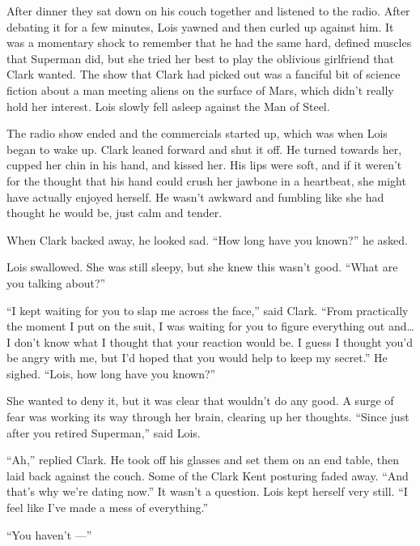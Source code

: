 After dinner they sat down on his couch together and listened to the
radio. After debating it for a few minutes, Lois yawned and then curled
up against him. It was a momentary shock to remember that he had the
same hard, defined muscles that Superman did, but she tried her best to
play the oblivious girlfriend that Clark wanted. The show that Clark had
picked out was a fanciful bit of science fiction about a man meeting
aliens on the surface of Mars, which didn't really hold her interest.
Lois slowly fell asleep against the Man of Steel.

The radio show ended and the commercials started up, which was when Lois
began to wake up. Clark leaned forward and shut it off. He turned
towards her, cupped her chin in his hand, and kissed her. His lips were
soft, and if it weren't for the thought that his hand could crush her
jawbone in a heartbeat, she might have actually enjoyed herself. He
wasn't awkward and fumbling like she had thought he would be, just calm
and tender.

When Clark backed away, he looked sad. ``How long have you known?'' he
asked.

Lois swallowed. She was still sleepy, but she knew this wasn't good.
``What are you talking about?''

``I kept waiting for you to slap me across the face,'' said Clark.
``From practically the moment I put on the suit, I was waiting for you
to figure everything out and\ldots{} I don't know what I thought that
your reaction would be. I guess I thought you'd be angry with me, but
I'd hoped that you would help to keep my secret.'' He sighed. ``Lois,
how long have you known?''

She wanted to deny it, but it was clear that wouldn't do any good. A
surge of fear was working its way through her brain, clearing up her
thoughts. ``Since just after you retired Superman,'' said Lois.

``Ah,'' replied Clark. He took off his glasses and set them on an end
table, then laid back against the couch. Some of the Clark Kent
posturing faded away. ``And that's why we're dating now.'' It wasn't a
question. Lois kept herself very still. ``I feel like I've made a mess
of everything.''

``You haven't ---''

